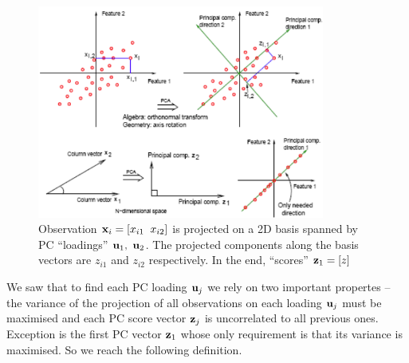 \documentclass[a4paper]{article}
\begin{document}
\begin{figure}[H]
    \centering
    \includegraphics[height=7cm]{img/pc_directions_and_scores.png}
   \caption{Observation $\textbf{x}_i = \left[x_{i1} \;\; x_{i2} \right]$ is projected on a 2D basis spanned by PC ``loadings'' $\textbf{u}_1,\ \textbf{u}_2$. The projected components along the basis vectors are $z_{i1}$ and $z_{i2}$ respectively. In the end, ``scores'' $\textbf{z}_1 = \left[z \right]$}
    
\end{figure}

We saw that to find each PC loading $\textbf{u}_j$ we rely on two important propertes -- the variance of the projection of all observations on each loading $\textbf{u}_j$ must be maximised and each PC score vector $\textbf{z}_j$ is uncorrelated to all previous ones. Exception is the first PC vector $\textbf{z}_1$ whose only requirement is that its variance is maximised. So we reach the following definition.
\end{document}
